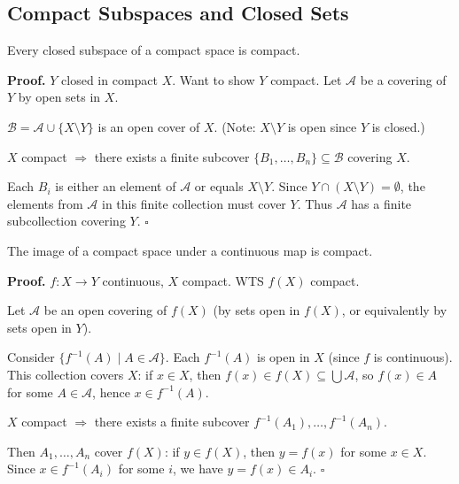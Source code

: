\documentclass[11pt]{report}
\renewenvironment{proof}[1][Proof]{\noindent\textbf{#1.} }{\hfill$\square$\par\vspace{5pt}}
\begin{document}
\subsection{Compact Subspaces and Closed Sets}

\begin{thmbox}
Every closed subspace of a compact space is compact.
\end{thmbox}

\begin{proof}
$Y$ closed in compact $X$. Want to show $Y$ compact. Let $\mathcal{A}$ be a covering of $Y$ by open sets in $X$.

$\mathcal{B} = \mathcal{A} \cup \{X \setminus Y\}$ is an open cover of $X$. (Note: $X \setminus Y$ is open since $Y$ is closed.)

$X$ compact $\Rightarrow$ there exists a finite subcover $\{B_1, \ldots, B_n\} \subseteq \mathcal{B}$ covering $X$.

Each $B_i$ is either an element of $\mathcal{A}$ or equals $X \setminus Y$. Since $Y \cap (X \setminus Y) = \emptyset$, the elements from $\mathcal{A}$ in this finite collection must cover $Y$. Thus $\mathcal{A}$ has a finite subcollection covering $Y$.
\end{proof}

\begin{thmbox}
The image of a compact space under a continuous map is compact.
\end{thmbox}

\begin{proof}
$f: X \to Y$ continuous, $X$ compact. WTS $f(X)$ compact.

Let $\mathcal{A}$ be an open covering of $f(X)$ (by sets open in $f(X)$, or equivalently by sets open in $Y$).

Consider $\{f^{-1}(A) \mid A \in \mathcal{A}\}$. Each $f^{-1}(A)$ is open in $X$ (since $f$ is continuous). This collection covers $X$: if $x \in X$, then $f(x) \in f(X) \subseteq \bigcup \mathcal{A}$, so $f(x) \in A$ for some $A \in \mathcal{A}$, hence $x \in f^{-1}(A)$.

$X$ compact $\Rightarrow$ there exists a finite subcover $f^{-1}(A_1), \ldots, f^{-1}(A_n)$.

Then $A_1, \ldots, A_n$ cover $f(X)$: if $y \in f(X)$, then $y = f(x)$ for some $x \in X$. Since $x \in f^{-1}(A_i)$ for some $i$, we have $y = f(x) \in A_i$.
\end{proof}
\end{document}
